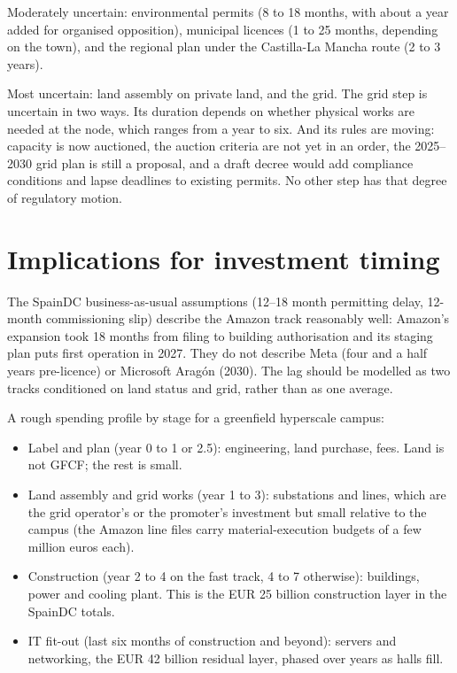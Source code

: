 \documentclass[11pt]{article}
\begin{document}
Moderately uncertain: environmental permits (8 to 18 months, with about a year added for organised opposition), municipal licences (1 to 25 months, depending on the town), and the regional plan under the Castilla-La Mancha route (2 to 3 years).

Most uncertain: land assembly on private land, and the grid. The grid step is uncertain in two ways. Its duration depends on whether physical works are needed at the node, which ranges from a year to six. And its rules are moving: capacity is now auctioned, the auction criteria are not yet in an order, the 2025--2030 grid plan is still a proposal, and a draft decree would add compliance conditions and lapse deadlines to existing permits. No other step has that degree of regulatory motion.

\section{Implications for investment timing}

The SpainDC business-as-usual assumptions (12--18 month permitting delay, 12-month commissioning slip) describe the Amazon track reasonably well: Amazon's expansion took 18 months from filing to building authorisation and its staging plan puts first operation in 2027. They do not describe Meta (four and a half years pre-licence) or Microsoft Aragón (2030). The lag should be modelled as two tracks conditioned on land status and grid, rather than as one average.

A rough spending profile by stage for a greenfield hyperscale campus:

\begin{itemize}[leftmargin=*]
\item Label and plan (year 0 to 1 or 2.5): engineering, land purchase, fees. Land is not GFCF; the rest is small.
\item Land assembly and grid works (year 1 to 3): substations and lines, which are the grid operator's or the promoter's investment but small relative to the campus (the Amazon line files carry material-execution budgets of a few million euros each).
\item Construction (year 2 to 4 on the fast track, 4 to 7 otherwise): buildings, power and cooling plant. This is the EUR 25 billion construction layer in the SpainDC totals.
\item IT fit-out (last six months of construction and beyond): servers and networking, the EUR 42 billion residual layer, phased over years as halls fill.
\end{itemize}
\end{document}
